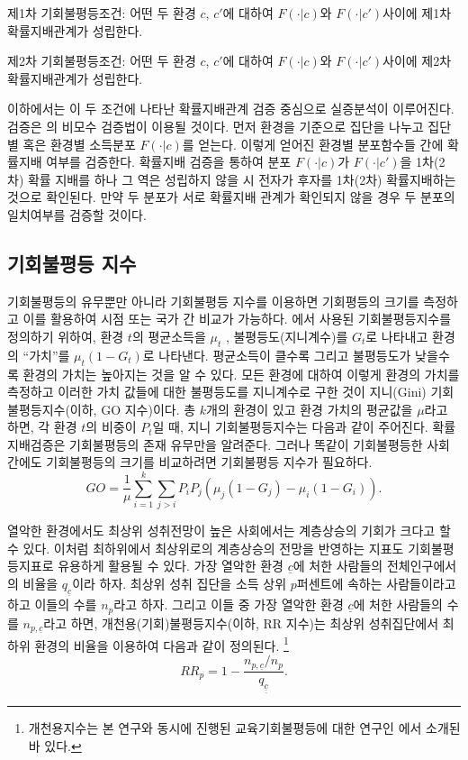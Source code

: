 제1차 기회불평등조건: 어떤 두 환경 $c$, $c'$에 대하여 $F(\cdot |c)$와 $F(\cdot |c')$사이에 제1차 확률지배관계가 성립한다.
 
제2차 기회불평등조건: 어떤 두 환경 $c$, $c'$에 대하여 $F(\cdot |c)$와 $F(\cdot |c')$사이에 제2차 확률지배관계가 성립한다.
 
이하에서는 이 두 조건에 나타난 확률지배관계 검증 중심으로 실증분석이 이루어진다.
검증은 \citet{dnd00}의 비모수 검증법이 이용될 것이다.
먼저 환경을 기준으로 집단을 나누고 집단별 혹은 환경별 소득분포 $F(\cdot |c)$를 얻는다.
이렇게 얻어진 환경별 분포함수들 간에 확률지배 여부를 검증한다.
확률지배 검증을 통하여 분포 $F(\cdot |c)$가 $F(\cdot |c')$을 1차(2차) 확률 지배를 하나 그 역은 성립하지 않을 시 전자가 후자를 1차(2차) 확률지배하는 것으로 확인된다.
만약 두 분포가 서로 확률지배 관계가 확인되지 않을 경우 두 분포의 일치여부를 검증할 것이다.
  
\subsection{기회불평등 지수}
기회불평등의 유무뿐만 아니라 기회불평등 지수를 이용하면 기회평등의 크기를 측정하고 이를 활용하여 시점 또는 국가 간 비교가 가능하다. 
\citet{letl08}에서 사용된 기회불평등지수를 정의하기 위하여, 환경 $t$의 평균소득을 $\mu _t$ , 불평등도(지니계수)를  $G _t$로 나타내고 환경 의 ``가치''를 $\mu _t (1-G _t)$로 나타낸다. 평균소득이 클수록 그리고 불평등도가 낮을수록 환경의 가치는 높아지는 것을 알 수 있다. 모든 환경에 대하여 이렇게 환경의 가치를 측정하고 이러한 가치 값들에 대한 불평등도를 지니계수로 구한 것이 지니(Gini) 기회불평등지수(이하, GO 지수)이다. 총 $k$개의 환경이 있고 환경 가치의 평균값을 $\mu$라고 하면, 각 환경 $t$의 비중이 $P_t$일 때, 지니 기회불평등지수는 다음과 같이 주어진다.
확률지배검증은 기회불평등의 존재 유무만을 알려준다.
그러나 똑같이 기회불평등한 사회 간에도 기회불평등의 크기를 비교하려면 기회불평등 지수가 필요하다.
\begin{equation}
    G O=\frac{1}{\mu} \sum_{i=1}^{k} \sum_{j>i} P_{i} P_{j}\left(\mu_{j}\left(1-G_{j}\right)-\mu_{i}\left(1-G_{i}\right)\right).
    \label{eq:klips_GOI}
\end{equation}

열악한 환경에서도 최상위 성취전망이 높은 사회에서는 계층상승의 기회가 크다고 할 수 있다.
이처럼 최하위에서 최상위로의 계층상승의 전망을 반영하는 지표도 기회불평등지표로 유용하게 활용될 수 있다.
 가장 열악한 환경 $\underline{c}$에 처한 사람들의 전체인구에서의 비율을  $q_{\underline{c}}$이라 하자.
 최상위 성취 집단을 소득 상위 $p$퍼센트에 속하는 사람들이라고 하고 이들의 수를 $n_p$라고 하자.
 그리고 이들 중 가장 열악한 환경  $\underline{c}$에 처한 사람들의 수를  $n_{p,\underline{c}}$라고 하면, 개천용(기회)불평등지수(이하, RR 지수)는 최상위 성취집단에서 최하위 환경의 비율을 이용하여 다음과 같이 정의된다.
\footnote{개천용지수는 본 연구와 동시에 진행된 교육기회불평등에 대한 연구인 \citet{ohetl16}에서 소개된 바 있다.}
\begin{equation}
    R R_{p}=1-\frac{n_{p, \underline{c}} / n_{p}}{q_{\underline{\underline{c}}}} .
    \label{eq:klips_RRI}
\end{equation}
 

